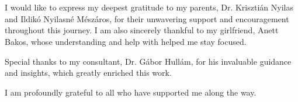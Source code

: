 \chapter*{\koszonetnyilvanitas}

I would like to express my deepest gratitude to my parents, Dr. Krisztián Nyilas and Ildikó Nyilasné Mészáros, for their unwavering support and encouragement throughout this journey. I am also sincerely thankful to my girlfriend, Anett Bakos, whose understanding and help with  helped me stay focused.

Special thanks to my consultant, Dr. Gábor Hullám, for his invaluable guidance and insights, which greatly enriched this work.

I am profoundly grateful to all who have supported me along the way.